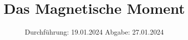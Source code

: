 

\subject{V105}
\title{Das Magnetische Moment}
\date{%
  Durchführung: 19.01.2024
  \hspace{3em}
  Abgabe: 27.01.2024
}



\maketitle
\thispagestyle{empty}
\tableofcontents
\newpage







\printbibliography{}


